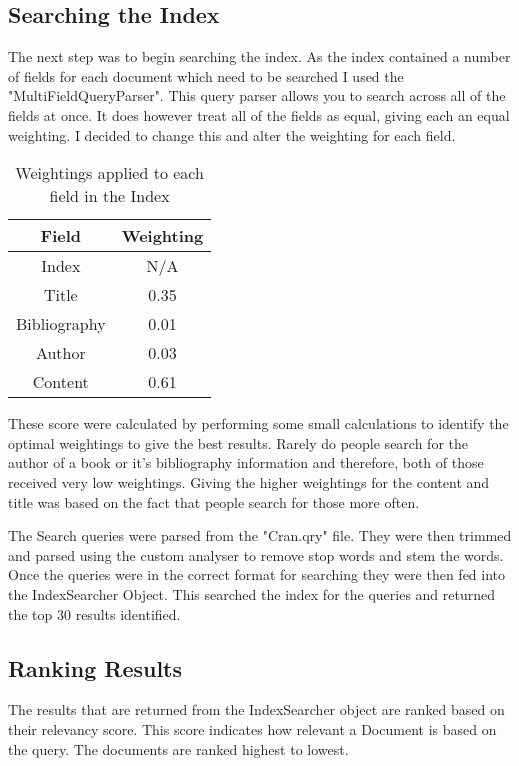 \subsection{Searching the Index}
The next step was to begin searching the index. As the index contained a number of fields for each document which need to be searched I used the "MultiFieldQueryParser". This query parser allows you to search across all of the fields at once. It does however treat all of the fields as equal, giving each an equal weighting. I decided to change this and alter the weighting for each field.
\begin{table}[H]
\begin{tabular}{
|| c c ||
}
\hline Field & Weighting \\
\hline\hline
Index & N/A\\
\hline
Title & 0.35\\
\hline
Bibliography & 0.01\\
\hline
Author & 0.03\\
\hline
Content & 0.61\\
\hline
\end{tabular}
\caption{Weightings applied to each field in the Index}
\end{table}

These score were calculated by performing some small calculations to identify the optimal weightings to give the best results. Rarely do people search for the author of a book or it's bibliography information and therefore, both of those received very low weightings. Giving the higher weightings for the content and title was based on the fact that people search for those more often.\newline
\par 
The Search queries were parsed from the "Cran.qry" file. They were then trimmed and parsed using the custom analyser to remove stop words and stem the words. Once the queries were in the correct format for searching they were then fed into the IndexSearcher Object. This searched the index for the queries and returned the top 30 results identified. 

\subsection{Ranking Results}
The results that are returned from the IndexSearcher object are ranked based on their relevancy score. This score indicates how relevant a Document is based on the query. The documents are ranked highest to lowest.


